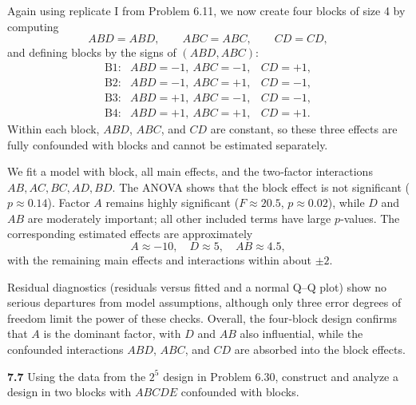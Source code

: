 \documentclass[answers,12pt,addpoints]{exam}
\begin{document}
\begin{solution}
Again using replicate I from Problem 6.11, we now create four blocks of size 4 by computing
\[
ABD = A B D,\qquad ABC = A B C,\qquad CD = C D,
\]
and defining blocks by the signs of $(ABD,ABC)$:
\[
\begin{array}{ccl}
\text{B1:} & ABD=-1,\ ABC=-1, & CD=+1,\\
\text{B2:} & ABD=-1,\ ABC=+1, & CD=-1,\\
\text{B3:} & ABD=+1,\ ABC=-1, & CD=-1,\\
\text{B4:} & ABD=+1,\ ABC=+1, & CD=+1.
\end{array}
\]
Within each block, $ABD$, $ABC$, and $CD$ are constant, so these three effects are fully confounded with blocks and cannot be estimated separately.

We fit a model with block, all main effects, and the two‑factor interactions $AB,AC,BC,AD,BD$. The ANOVA shows that the block effect is not significant ($p \approx 0.14$). Factor $A$ remains highly significant ($F \approx 20.5$, $p \approx 0.02$), while $D$ and $AB$ are moderately important; all other included terms have large $p$‑values. The corresponding estimated effects are approximately
\[
A \approx -10,\quad D \approx 5,\quad AB \approx 4.5,
\]
with the remaining main effects and interactions within about $\pm 2$.

Residual diagnostics (residuals versus fitted and a normal Q–Q plot) show no serious departures from model assumptions, although only three error degrees of freedom limit the power of these checks. Overall, the four‑block design confirms that $A$ is the dominant factor, with $D$ and $AB$ also influential, while the confounded interactions $ABD$, $ABC$, and $CD$ are absorbed into the block effects.
\end{solution}

\bigskip

\textbf{7.7}
Using the data from the $2^5$ design in Problem 6.30, construct and analyze a design in two blocks with $ABCDE$ confounded with blocks.
\end{document}

